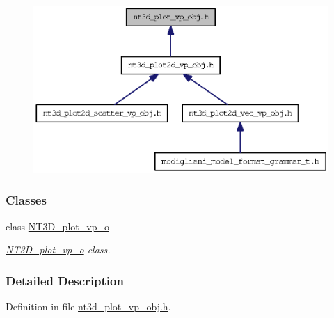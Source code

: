 \begin{figure}[H]
\begin{center}
\leavevmode
\includegraphics[width=393pt]{nt3d__plot__vp__obj_8h__dep__incl}
\end{center}
\end{figure}
\subsubsection*{Classes}
\begin{DoxyCompactItemize}
\item 
class \hyperlink{class_n_t3_d__plot__vp__o}{NT3D\_\-plot\_\-vp\_\-o}
\begin{DoxyCompactList}\small\item\em \hyperlink{class_n_t3_d__plot__vp__o}{NT3D\_\-plot\_\-vp\_\-o} class. \item\end{DoxyCompactList}\end{DoxyCompactItemize}


\subsubsection{Detailed Description}


Definition in file \hyperlink{nt3d__plot__vp__obj_8h_source}{nt3d\_\-plot\_\-vp\_\-obj.h}.

